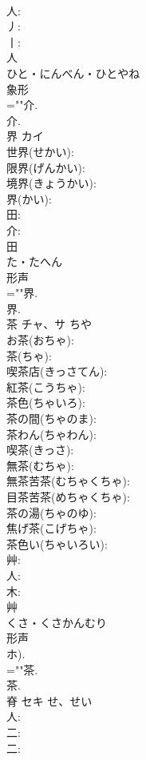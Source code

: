 \documentclass[8pt]{extreport}
\begin{document}
\begin{CJK}{UTF8}{min}
\\	人: 
\\	丿: 
\\	丨: 
\\	人	
\\	ひと・にんべん・ひとやね	
\\	象形 
\\	=""介.
\\	介.
\\	界	カイ			
\\	世界(せかい): 
\\	限界(げんかい): 
\\	境界(きょうかい): 
\\	界(かい): 
\\	田: 
\\	介: 
\\	田	
\\	た・たへん	
\\	形声 
\\	=""界.
\\	界.
\\	茶	チャ、サ		ちや	
\\	お茶(おちゃ): 
\\	茶(ちゃ): 
\\	喫茶店(きっさてん): 
\\	紅茶(こうちゃ): 
\\	茶色(ちゃいろ): 
\\	茶の間(ちゃのま): 
\\	茶わん(ちゃわん): 
\\	喫茶(きっさ): 
\\	無茶(むちゃ): 
\\	無茶苦茶(むちゃくちゃ): 
\\	目茶苦茶(めちゃくちゃ): 
\\	茶の湯(ちゃのゆ): 
\\	焦げ茶(こげちゃ): 
\\	茶色い(ちゃいろい): 
\\	艸: 
\\	人: 
\\	木: 
\\	艸	
\\	くさ・くさかんむり	
\\	形声 
\\	ホ).
\\	=""茶.
\\	茶.
\\	脊	セキ	せ、せい		
\\	人: 
\\	二: 
\\	二: 

\end{CJK}
\end{document}
